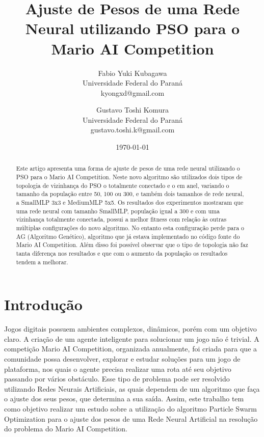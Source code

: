 \documentclass[a4paper,12pt]{article}
\begin{document}
  \title{Ajuste de Pesos de uma Rede Neural utilizando PSO para o Mario AI Competition}	
  \author{
    Fabio Yuki Kubagawa\\ {\small Universidade Federal do Paraná}\\ {\small kyongxd@gmail.com}
    \and
    Gustavo Toshi Komura\\ {\small Universidade Federal do Paraná}\\ {\small gustavo.toshi.k@gmail.com}
  }
  \date{\today}
  \maketitle
  \thispagestyle{empty}
  
  \begin{abstract}

    Este artigo apresenta uma forma de ajuste de pesos de uma rede neural utilizando o PSO 
    para o Mario AI Competition. Neste novo algoritmo são utilizados dois tipos de 
    topologia de vizinhança do PSO o totalmente conectado e o em anel, variando o tamanho 
    da população entre 50, 100 ou 300, e também dois tamanhos de rede neural, a SmallMLP 
    3x3 e MediumMLP 5x5. Os resultados dos experimentos mostraram que uma rede neural com 
    tamanho SmallMLP, população igual a 300 e com uma vizinhança totalmente conectada, possui 
    a melhor fitness com relação às outras múltiplas configurações do novo algoritmo. No 
    entanto esta configuração perde para o AG (Algoritmo Genético), algoritmo que já estava 
    implementado no código fonte do Mario AI Competition. Além disso foi possível observar 
    que o tipo de topologia não faz tanta diferença nos resultados e que com o aumento da 
    população os resultados tendem a melhorar.
  
  \end{abstract}   
  
  \section{Introdução}
    
    Jogos digitais possuem ambientes complexos, dinâmicos, porém com um objetivo claro. A criação 
    de um agente inteligente para solucionar um jogo não é trivial. A competição Mario AI 
    Competition, organizada anualmente, foi criada para que a comunidade possa desenvolver, 
    explorar e estudar soluções para um jogo de plataforma, nos quais o agente precisa realizar 
    uma rota até seu objetivo passando por vários obstáculo. Esse tipo de problema pode ser 
    resolvido utilizando Redes Neurais Artificiais, as quais dependem de um algoritmo que 
    faça o ajuste dos seus pesos, que determina a sua saída. Assim, este trabalho tem como 
    objetivo realizar um estudo sobre a utilização do algoritmo Particle Swarm Optimization 
    para o ajuste dos pesos de uma Rede Neural Artificial na resolução do problema do 
    Mario AI Competition.
\end{document}
